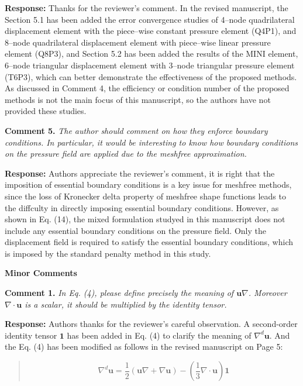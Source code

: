 \documentclass{article}
\begin{document}
\textbf{Response:} Thanks for the reviewer's comment.
In the revised manuscript, the Section 5.1 has been added the error convergence studies of 4--node quadrilateral displacement element with the piece--wise constant pressure element (Q4P1), and 8--node quadrilateral displacement element with piece--wise linear pressure element (Q8P3), and Section 5.2 has been added the results of 
the MINI element, 6--node triangular displacement element with 3--node triangular pressure element (T6P3), which can better demonstrate the effectiveness of the proposed methods.
As discussed in Comment 4, the efficiency or condition number of the proposed methods is not the main focus of this manuscript, so the authors have not provided these studies.

\textbf{Comment 5.} \textit{
The author should comment on how they enforce boundary conditions. In particular, it would be interesting to know how boundary conditions on the pressure field are applied due to the meshfree approximation.
}

\textbf{Response:} Authors appreciate the reviewer's comment, it is right that the imposition of essential boundary conditions is a key issue for meshfree methods, since the loss of Kronecker delta property of meshfree shape functions leads to the diffculty in directly imposing essential boundary conditions.
However, as shown in Eq. (14), the mixed formulation studyed in this manuscript does not include any essential boundary conditions on the pressure field. Only the displacement field is required to satisfy the essential boundary conditions, which is imposed by the standard penalty method in this study.

\noindent\textbf{Minor Comments}

\textbf{Comment 1.} \textit{
In Eq. (4), please define precisely the meaning of $\boldsymbol u\nabla$. Moreover $\nabla \cdot \boldsymbol u$ is a scalar, it should be multiplied by the identity tensor.
}

\textbf{Response:} Authors thanks for the reviewer's careful observation.
A second-order identity tensor $\boldsymbol 1$ has been added in Eq. (4) to clarify the meaning of $\nabla^d \boldsymbol u$. 
And the Eq. (4) has been modified as follows in the revised manuscript on Page 5:
\begin{quote}
\begin{equation}
\nabla^d \boldsymbol{u} = \frac{1}{2}(\boldsymbol{u} \nabla + \nabla \boldsymbol{u}) - (\frac{1}{3} \nabla \cdot \boldsymbol{u}) \boldsymbol{1}
\end{equation}
\end{quote}
\end{document}

